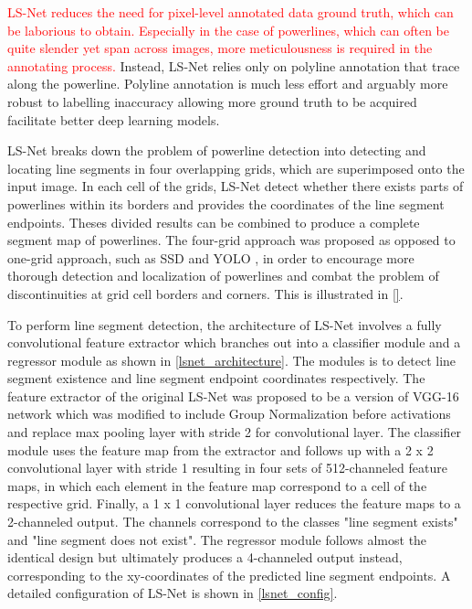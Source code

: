\documentclass[journal]{IEEEtran}
\begin{document}
\textcolor{red}{LS-Net reduces the need for pixel-level annotated data ground truth, which can be laborious to obtain. Especially in the case of powerlines, which can often be quite slender yet span across images, more meticulousness is required in the annotating process.} Instead, LS-Net relies only on polyline annotation that trace along the powerline. Polyline annotation is much less effort and arguably more robust to labelling inaccuracy allowing more ground truth to be acquired facilitate better deep learning models. 

LS-Net breaks down the problem of powerline detection into detecting and locating line segments in four overlapping grids, which are superimposed onto the input image. In each cell of the grids,  LS-Net detect whether there exists parts of powerlines within its borders and provides the coordinates of the line segment endpoints. Theses divided results can be combined to produce a complete segment map of powerlines. The four-grid approach was proposed as opposed to one-grid approach, such as SSD \cite{SSD} and YOLO \cite{YOLO}, in order to encourage more thorough detection and localization of powerlines and combat the problem of discontinuities at grid cell borders and corners. This is illustrated in \ref{}. 

To perform line segment detection, the architecture of LS-Net involves a fully convolutional feature extractor which branches out into a classifier module and a regressor module as shown in \ref{lsnet_architecture}. The modules is to detect line segment existence and line segment endpoint coordinates respectively. The feature extractor of the original LS-Net was proposed to be a version of VGG-16 network \cite{VGG16} which was modified to include Group Normalization \cite{group_norm} before activations and replace max pooling layer with stride 2 for convolutional layer. The classifier module uses the feature map from the extractor and follows up with a 2 x 2 convolutional layer with stride 1 resulting in four sets of 512-channeled feature maps, in which each element in the feature map correspond to a cell of the respective grid. Finally, a 1 x 1 convolutional layer reduces the feature maps to a 2-channeled output. The channels correspond to the classes "line segment exists" and "line segment does not exist". The regressor module follows almost the identical design but ultimately produces a 4-channeled output instead, corresponding to the xy-coordinates of the predicted line segment endpoints. A detailed configuration of LS-Net is shown in \ref{lsnet_config}.
\end{document}
